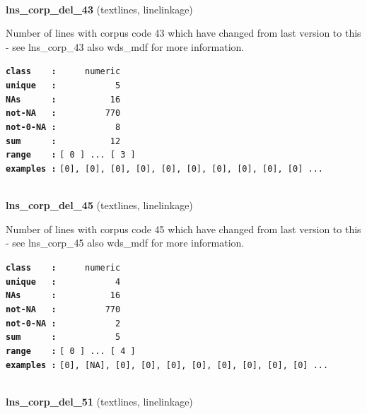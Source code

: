 \documentclass[]{article}
\begin{document}
~

\textbf{lns\_corp\_del\_43} (textlines, linelinkage)

Number of lines with corpus code 43 which have changed from last version
to this - see lns\_corp\_43 also wds\_mdf for more information.

\textbf{\texttt{class\ \ \ \ :}} \texttt{~~~~~numeric}\\
\textbf{\texttt{unique\ \ \ :}} \texttt{~~~~~~~~~~~5}\\
\textbf{\texttt{NAs\ \ \ \ \ \ :}} \texttt{~~~~~~~~~~16}\\
\textbf{\texttt{not-NA\ \ \ :}} \texttt{~~~~~~~~~770}\\
\textbf{\texttt{not-0-NA\ :}} \texttt{~~~~~~~~~~~8}\\
\textbf{\texttt{sum\ \ \ \ \ \ :}} \texttt{~~~~~~~~~~12}\\
\textbf{\texttt{range\ \ \ \ :}}
\texttt{{[}\ 0\ {]}\ ...\ {[}\ 3\ {]}}\\
\textbf{\texttt{examples\ :}}
\texttt{{[}0{]},\ {[}0{]},\ {[}0{]},\ {[}0{]},\ {[}0{]},\ {[}0{]},\ {[}0{]},\ {[}0{]},\ {[}0{]},\ {[}0{]}\ ...}\\

~

\textbf{lns\_corp\_del\_45} (textlines, linelinkage)

Number of lines with corpus code 45 which have changed from last version
to this - see lns\_corp\_45 also wds\_mdf for more information.

\textbf{\texttt{class\ \ \ \ :}} \texttt{~~~~~numeric}\\
\textbf{\texttt{unique\ \ \ :}} \texttt{~~~~~~~~~~~4}\\
\textbf{\texttt{NAs\ \ \ \ \ \ :}} \texttt{~~~~~~~~~~16}\\
\textbf{\texttt{not-NA\ \ \ :}} \texttt{~~~~~~~~~770}\\
\textbf{\texttt{not-0-NA\ :}} \texttt{~~~~~~~~~~~2}\\
\textbf{\texttt{sum\ \ \ \ \ \ :}} \texttt{~~~~~~~~~~~5}\\
\textbf{\texttt{range\ \ \ \ :}}
\texttt{{[}\ 0\ {]}\ ...\ {[}\ 4\ {]}}\\
\textbf{\texttt{examples\ :}}
\texttt{{[}0{]},\ {[}NA{]},\ {[}0{]},\ {[}0{]},\ {[}0{]},\ {[}0{]},\ {[}0{]},\ {[}0{]},\ {[}0{]},\ {[}0{]}\ ...}\\

~

\textbf{lns\_corp\_del\_51} (textlines, linelinkage)
\end{document}
